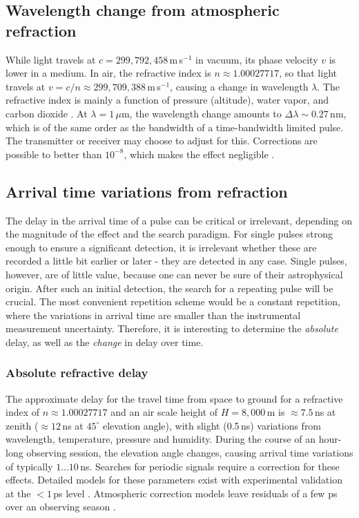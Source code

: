 \documentclass[twocolumn,tighten,longauthor]{myaastex62}
\begin{document}
\subsection{Wavelength change from atmospheric refraction}
\label{sub:wave_ref}
While light travels at $c=299{,}792{,}458\,$m\,s$^{-1}$ in vacuum, its phase velocity $v$ is lower in a medium. In air, the refractive index is $n\approx1.00027717$, so that light travels at $v=c/n\approx299{,}709{,}388$\,m\,s$^{-1}$, causing a change in wavelength $\lambda$. The refractive index is mainly a function of pressure (altitude), water vapor, and carbon dioxide \citep{1966Metro...2...71E}. At $\lambda=1\,\mu$m, the wavelength change amounts to $\Delta \lambda \sim 0.27\,$nm, which is of the same order as the bandwidth of a time-bandwidth limited pulse. The transmitter or receiver may choose to adjust for this. Corrections are possible to better than $10^{-8}$, which makes the effect negligible \citep{1966Metro...2...71E}.


\subsection{Arrival time variations from refraction}
The delay in the arrival time of a pulse can be critical or irrelevant, depending on the magnitude of the effect and the search paradigm. For single pulses strong enough to ensure a significant detection, it is irrelevant whether these are recorded a little bit earlier or later - they are detected in any case. Single pulses, however, are of little value, because one can never be sure of their astrophysical origin. After such an initial detection, the search for a repeating pulse will be crucial. The most convenient repetition scheme would be a constant repetition, where the variations in arrival time are smaller than the instrumental measurement uncertainty. Therefore, it is interesting to determine the \textit{absolute} delay, as well as the \textit{change} in delay over time.


\subsubsection{Absolute refractive delay}
\label{sub:abs_ref_delay}
The approximate delay for the travel time from space to ground for a refractive index of $n\approx1.00027717$ and an air scale height of $H=8{,}000\,$m is $\approx7.5\,$ns at zenith ($\approx12\,$ns at $45^{\circ}$ elevation angle), with slight (0.5\,ns) variations from wavelength, temperature, pressure and humidity. During the course of an hour-long observing session, the elevation angle changes, causing arrival time variations of typically $1\dots10$\,ns. Searches for periodic signals require a correction for these effects. Detailed models for these parameters exist with experimental validation at the $<1\,$ps level \citep{Mendes2004}. Atmospheric correction models leave residuals of a few ps over an observing season \citep{Wijaya2011}.
\end{document}
